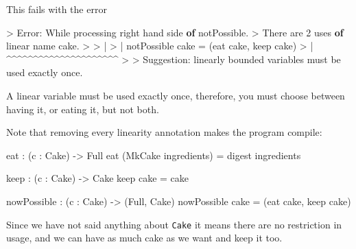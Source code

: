 \documentclass[
]{article}
\newenvironment{Shaded}{}{}
\newcommand{\DataTypeTok}[1]{\textcolor[rgb]{0.56,0.13,0.00}{#1}}
\newcommand{\DecValTok}[1]{\textcolor[rgb]{0.25,0.63,0.44}{#1}}
\newcommand{\KeywordTok}[1]{\textcolor[rgb]{0.00,0.44,0.13}{\textbf{#1}}}
\newcommand{\NormalTok}[1]{#1}
\newcommand{\OperatorTok}[1]{\textcolor[rgb]{0.40,0.40,0.40}{#1}}
\newcommand{\OtherTok}[1]{\textcolor[rgb]{0.00,0.44,0.13}{#1}}
\begin{document}
This fails with the error

\begin{Shaded}
\begin{Highlighting}[]
\OperatorTok{\textgreater{}} \DataTypeTok{Error}\OperatorTok{:} \DataTypeTok{While}\NormalTok{ processing right hand side }\KeywordTok{of}\NormalTok{ notPossible}\OperatorTok{.}
\OperatorTok{\textgreater{}}   \DataTypeTok{There}\NormalTok{ are }\DecValTok{2}\NormalTok{ uses }\KeywordTok{of}\NormalTok{ linear name cake}\OperatorTok{.}
\OperatorTok{\textgreater{}} 
\OperatorTok{\textgreater{}}     \OperatorTok{|}
\OperatorTok{\textgreater{}}     \OperatorTok{|}\NormalTok{ notPossible cake }\OtherTok{=}\NormalTok{ (eat cake, keep cake)}
\OperatorTok{\textgreater{}}     \OperatorTok{|}                    \OperatorTok{\^{}\^{}\^{}\^{}\^{}\^{}\^{}\^{}\^{}\^{}\^{}\^{}\^{}\^{}\^{}\^{}\^{}\^{}\^{}\^{}\^{}}
\OperatorTok{\textgreater{}} 
\OperatorTok{\textgreater{}} \DataTypeTok{Suggestion}\OperatorTok{:}\NormalTok{ linearly bounded variables must be used exactly once}\OperatorTok{.}
\end{Highlighting}
\end{Shaded}

A linear variable must be used exactly once, therefore, you must choose
between having it, or eating it, but not both.

Note that removing every linearity annotation makes the program compile:

\begin{Shaded}
\begin{Highlighting}[]
\NormalTok{eat }\OperatorTok{:}\NormalTok{ (c }\OperatorTok{:} \DataTypeTok{Cake}\NormalTok{) }\OtherTok{{-}\textgreater{}} \DataTypeTok{Full}
\NormalTok{eat (}\DataTypeTok{MkCake}\NormalTok{ ingredients) }\OtherTok{=}\NormalTok{ digest ingredients}

\NormalTok{keep }\OperatorTok{:}\NormalTok{ (c }\OperatorTok{:} \DataTypeTok{Cake}\NormalTok{) }\OtherTok{{-}\textgreater{}} \DataTypeTok{Cake}
\NormalTok{keep cake }\OtherTok{=}\NormalTok{ cake}

\NormalTok{nowPossible }\OperatorTok{:}\NormalTok{ (c }\OperatorTok{:} \DataTypeTok{Cake}\NormalTok{) }\OtherTok{{-}\textgreater{}}\NormalTok{ (}\DataTypeTok{Full}\NormalTok{, }\DataTypeTok{Cake}\NormalTok{)}
\NormalTok{nowPossible cake }\OtherTok{=}\NormalTok{ (eat cake, keep cake)}
\end{Highlighting}
\end{Shaded}

Since we have not said anything about \texttt{Cake} it means there are
no restriction in usage, and we can have as much cake as we want and
keep it too.
\end{document}
